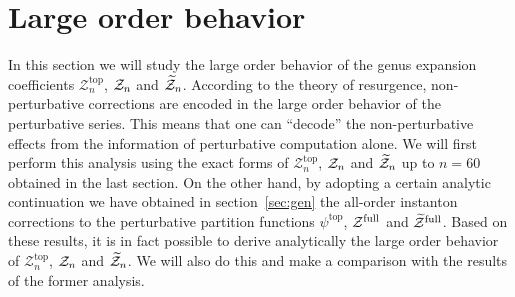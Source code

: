 \documentclass[11pt]{article}
\newcommand{\Ztop}{\mathcal{Z}^{\text{top}}}
\renewcommand{\[}{\begin{eqnarray}}
\renewcommand{\]}{\end{eqnarray}}
\newcommand{\Zefull}{{\cal Z}^{\text{full}}}
\newcommand{\Zofull}{{\widetilde{\cal Z}}^{\text{full}}}
\newcommand{\Zeven}{{\cal Z}}
\newcommand{\Zodd}{{\widetilde{\cal Z}}}
\begin{document}
\section{Large order behavior \label{sec:large}}

In this section we will study the large order behavior
of the genus expansion coefficients
$\Ztop_n$, $\Zeven_n$ and $\Zodd_n$.
According to the theory of resurgence, non-perturbative corrections
are encoded in the large order behavior of the perturbative series.
This means that one can
``decode'' the non-perturbative effects from the information 
of perturbative computation alone.
We will first perform this analysis using the exact forms
of $\Ztop_n$, $\Zeven_n$ and $\Zodd_n$ up to $n=60$
obtained in the last section.
On the other hand, by adopting a certain analytic continuation
we have obtained in section~\ref{sec:gen}
the all-order instanton corrections to the perturbative partition
functions $\psi^{\text{top}}$, $\Zefull$ and $\Zofull$.
Based on these results,
it is in fact possible to derive analytically
the large order behavior of $\Ztop_n$, $\Zeven_n$ and $\Zodd_n$.
We will also do this and make a comparison
with the results of the former analysis.
\end{document}
